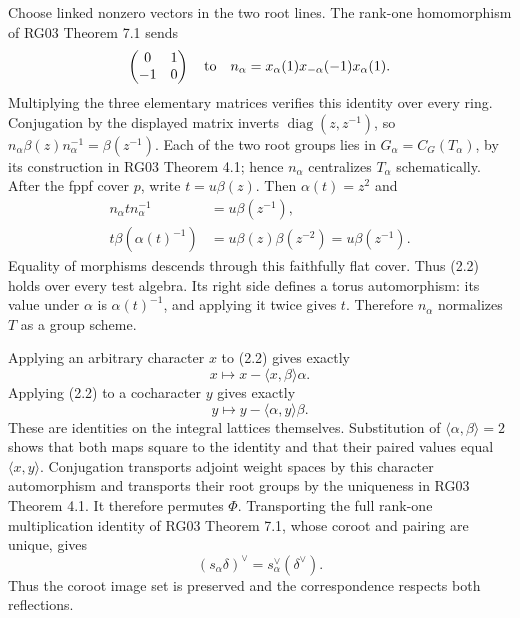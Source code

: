 \documentclass[11pt,a4paper,openany]{report}
\begin{document}
Choose linked nonzero vectors in the two root lines. The rank-one homomorphism of RG03 Theorem 7.1 sends \[
 \begin{pmatrix}0&1\\-1&0\end{pmatrix}
 \quad\hbox{to}\quad
 n_\alpha=x_\alpha(1)x_{-\alpha}(-1)x_\alpha(1).
\] Multiplying the three elementary matrices verifies this identity over every ring. Conjugation by the displayed matrix inverts \(\operatorname{diag}(z,z^{-1})\), so \(n_\alpha\beta(z)n_\alpha^{-1}=\beta(z^{-1})\). Each of the two root groups lies in \(G_\alpha=C_G(T_\alpha)\), by its construction in RG03 Theorem 4.1; hence \(n_\alpha\) centralizes \(T_\alpha\) schematically. After the fppf cover \(p\), write \(t=u\beta(z)\). Then \(\alpha(t)=z^2\) and \[
 \begin{aligned}
 n_\alpha t n_\alpha^{-1}&=u\beta(z^{-1}),\\
 t\beta(\alpha(t)^{-1})
       &=u\beta(z)\beta(z^{-2})=u\beta(z^{-1}).
 \end{aligned}
\] Equality of morphisms descends through this faithfully flat cover. Thus (2.2) holds over every test algebra. Its right side defines a torus automorphism: its value under \(\alpha\) is \(\alpha(t)^{-1}\), and applying it twice gives \(t\). Therefore \(n_\alpha\) normalizes \(T\) as a group scheme.

Applying an arbitrary character \(x\) to (2.2) gives exactly \[
 x\longmapsto x-\langle x,\beta\rangle\alpha.
\] Applying (2.2) to a cocharacter \(y\) gives exactly \[
 y\longmapsto y-\langle\alpha,y\rangle\beta.
\] These are identities on the integral lattices themselves. Substitution of \(\langle\alpha,\beta\rangle=2\) shows that both maps square to the identity and that their paired values equal \(\langle x,y\rangle\). Conjugation transports adjoint weight spaces by this character automorphism and transports their root groups by the uniqueness in RG03 Theorem 4.1. It therefore permutes \(\Phi\). Transporting the full rank-one multiplication identity of RG03 Theorem 7.1, whose coroot and pairing are unique, gives \[
        (s_\alpha\delta)^\vee=s_\alpha^\vee(\delta^\vee).
\] Thus the coroot image set is preserved and the correspondence respects both reflections.
\end{document}
